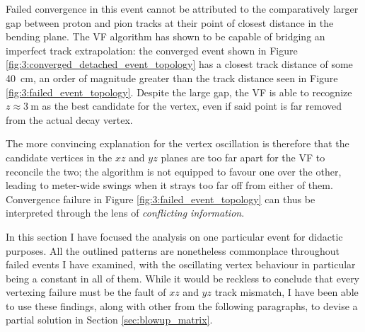 Failed convergence in this event cannot be attributed to the comparatively larger gap between proton and pion tracks at their point of closest distance in the bending plane.
The VF algorithm has shown to be capable of bridging an imperfect track extrapolation: the converged event shown in Figure \ref{fig:3:converged_detached_event_topology} has a closest track distance of some \SI{40}{\centi\meter}, an order of magnitude greater than the track distance seen in Figure \ref{fig:3:failed_event_topology}.
Despite the large gap, the VF is able to recognize $z \approx \SI{3}{\meter}$ as the best candidate for the vertex, even if said point is far removed from the actual \lambdadecay decay vertex.


The more convincing explanation for the vertex oscillation is therefore that the candidate vertices in the $xz$ and $yz$ planes are too far apart for the VF to reconcile the two; the algorithm is not equipped to favour one over the other, leading to meter-wide swings when it strays too far off from either of them.
Convergence failure in Figure \ref{fig:3:failed_event_topology} can thus be interpreted through the lens of \textit{conflicting information}.

In this section I have focused the analysis on one particular event for didactic purposes.
All the outlined patterns are nonetheless commonplace throughout failed events I have examined, with the oscillating vertex behaviour in particular being a constant in all of them.
While it would be reckless to conclude that every \lambdadecay vertexing failure must be the fault of $xz$ and $yz$ track mismatch, I have been able to use these findings, along with other from the following paragraphs, to devise a partial solution in Section \ref{sec:blowup_matrix}.

